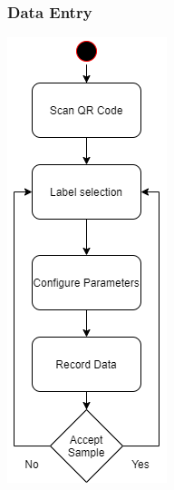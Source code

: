 \subsubsection{Data Entry}
\begin{center}
    \includegraphics[width=\textwidth,height=0.8\textheight,keepaspectratio]{charts/flow2.png}
\end{center}
